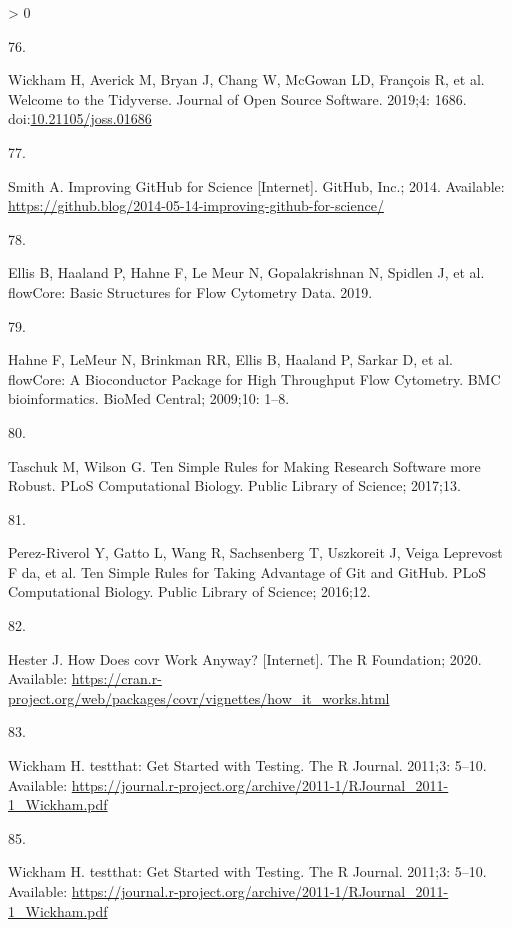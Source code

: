 \documentclass[10pt,letterpaper]{article}
\newlength{\csllabelwidth}
\newlength{\cslhangindent}
\newenvironment{CSLReferences}[3] %
 {%
  \setlength{\parindent}{0pt}
  \ifodd #1 \everypar{\setlength{\hangindent}{\cslhangindent}}\ignorespaces\fi
  \ifnum #2 > 0
  \setlength{\parskip}{#2\baselineskip}
  \fi
 }%
 {}
\newcommand{\CSLLeftMargin}[1]{\parbox[t]{\csllabelwidth}{#1}}
\newcommand{\CSLRightInline}[1]{\parbox[t]{\linewidth - \csllabelwidth}{#1}}
\begin{document}
\begin{CSLReferences}{0}{0}
\leavevmode\hypertarget{ref-tidyverse}{}%
\CSLLeftMargin{76. }
\CSLRightInline{Wickham H, Averick M, Bryan J, Chang W, McGowan LD,
François R, et al. {Welcome to the Tidyverse}. Journal of Open Source
Software. 2019;4: 1686.
doi:\href{https://doi.org/10.21105/joss.01686}{10.21105/joss.01686}}

\leavevmode\hypertarget{ref-smith2014}{}%
\CSLLeftMargin{77. }
\CSLRightInline{Smith A. {Improving GitHub for Science} {[}Internet{]}.
GitHub, Inc.; 2014. Available:
\url{https://github.blog/2014-05-14-improving-github-for-science/}}

\leavevmode\hypertarget{ref-flowCore}{}%
\CSLLeftMargin{78. }
\CSLRightInline{Ellis B, Haaland P, Hahne F, Le Meur N, Gopalakrishnan
N, Spidlen J, et al. {flowCore: Basic Structures for Flow Cytometry
Data}. 2019. }

\leavevmode\hypertarget{ref-hahne2009}{}%
\CSLLeftMargin{79. }
\CSLRightInline{Hahne F, LeMeur N, Brinkman RR, Ellis B, Haaland P,
Sarkar D, et al. {flowCore: A Bioconductor Package for High Throughput
Flow Cytometry}. BMC bioinformatics. BioMed Central; 2009;10: 1--8. }

\leavevmode\hypertarget{ref-taschuk2017}{}%
\CSLLeftMargin{80. }
\CSLRightInline{Taschuk M, Wilson G. {Ten Simple Rules for Making
Research Software more Robust}. PLoS Computational Biology. Public
Library of Science; 2017;13. }

\leavevmode\hypertarget{ref-perez2016}{}%
\CSLLeftMargin{81. }
\CSLRightInline{Perez-Riverol Y, Gatto L, Wang R, Sachsenberg T,
Uszkoreit J, Veiga Leprevost F da, et al. {Ten Simple Rules for Taking
Advantage of Git and GitHub}. PLoS Computational Biology. Public Library
of Science; 2016;12. }

\leavevmode\hypertarget{ref-hester2020}{}%
\CSLLeftMargin{82. }
\CSLRightInline{Hester J. {How Does covr Work Anyway?} {[}Internet{]}.
The R Foundation; 2020. Available:
\url{https://cran.r-project.org/web/packages/covr/vignettes/how_it_works.html}}

\leavevmode\hypertarget{ref-wickham2011}{}%
\CSLLeftMargin{83. }
\CSLRightInline{Wickham H. {testthat: Get Started with Testing}. The R
Journal. 2011;3: 5--10. Available:
\url{https://journal.r-project.org/archive/2011-1/RJournal_2011-1_Wickham.pdf}}

\leavevmode\hypertarget{ref-testthat}{}%
\CSLLeftMargin{85. }
\CSLRightInline{Wickham H. {testthat: Get Started with Testing}. The R
Journal. 2011;3: 5--10. Available:
\url{https://journal.r-project.org/archive/2011-1/RJournal_2011-1_Wickham.pdf}}


\end{CSLReferences}
\end{document}
